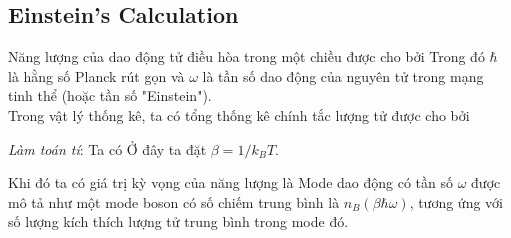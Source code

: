 \subsection{Einstein's Calculation}
Năng lượng của dao động tử điều hòa trong một chiều được cho bởi
Trong đó $\hbar$ là hằng số Planck rút gọn và $\omega$ là tần số dao động của nguyên tử trong mạng tinh thể (hoặc tần số "Einstein").\\
Trong vật lý thống kê, ta có tổng thống kê chính tắc lượng tử được cho bởi
    \begin{more}
        \textit{Làm toán tí}: Ta có 
        Ở đây ta đặt $\beta = 1/k_B T$.
    \end{more}
Khi đó ta có giá trị kỳ vọng của năng lượng là 
    Mode dao động có tần số $\omega$ được mô tả như một mode boson có số chiếm trung bình là $n_B(\beta\hbar\omega)$, tương ứng với số lượng kích thích lượng tử trung bình trong mode đó.

